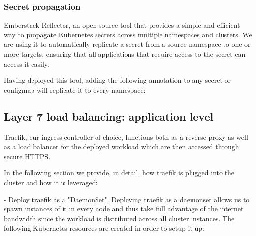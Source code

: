 \subsubsection{Secret propagation}

Emberstack Reflector, an open-source tool that provides a simple and efficient way to propagate Kubernetes secrets across multiple namespaces and clusters. We are using it to automatically replicate a secret from a source namespace to one or more targets, ensuring that all applications that require access to the secret can access it easily.

Having deployed this tool, adding the following annotation to any secret or configmap will replicate it to every namespace:


\subsection{Layer 7 load balancing: application level }

Traefik, our ingress controller of choice, functions both as a reverse proxy as well as a load balancer for the deployed workload which are then accessed through secure HTTPS. 

In the following section we provide, in detail, how traefik is plugged into the cluster and how it is leveraged: 

- Deploy traefik as a "DaemonSet". Deploying traefik as a daemonset allows us to spawn instances of it in every node and thus take full advantage of the internet bandwidth since the workload is distributed across all cluster instances. The following Kubernetes resources are created in order to setup it up:


